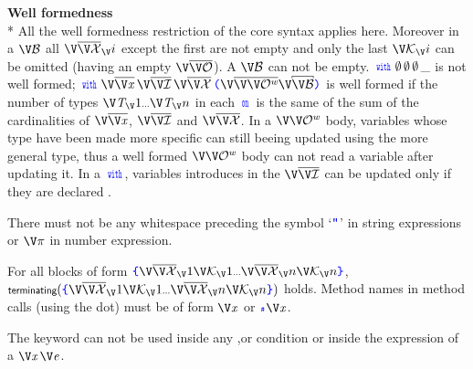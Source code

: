 \parbox{\linewidth}{
\textbf{Well formedness}\small\\*
All the well formedness restriction of the core syntax applies here.
Moreover in a $\block$ all $\es_\vi$ except the first are not empty and only the last $\catch_\vi$ can be omitted (having an empty $\ons$).
A $\block$ can not be empty.
$\withKw\, \emptyset\,\emptyset\, \emptyset\,\_$ is not well formed;
$\withKw\,\xs\,\is\,\es\, %
\oRound\Many\onWith\Opt\block\cRound$
is well formed if the number of types $\T_\vI\ldots\T_\vn$ in each $\onKw$ is the same of the sum of the cardinalities of $\xs$, $\is$ and $\es$.
In a $\onWith$ body, variables whose type have been made more specific can still beeing updated using the more general type, thus 
a well formed $\onWith$ body can not read a variable after updating it.
In a $\withKw$, variables introduces in the $\is$ can be updated only if they are declared \Q@var@.


There must not be any whitespace preceding the symbol `$ \mbox{\color{blue}{\texttt{"}}} $' in string expressions or $\Path$ in number expression.

For all blocks of form
$\oCurly\es_\vI\catch_\vI\ldots\es_\vn\catch_\vn\cCurly$,
$
\SyntaxFlow{\oCurly\es_\vI\catch_\vI\ldots\es_\vn\catch_\vn\cCurly}
$
holds.
Method names in method calls (using the dot) must be of form $\x$ or $\hash\x$.

The \Q@return@ keyword can not be used inside any \Q@if@,\Q@case@ or \Q@while@ condition or inside the expression of a $\x$\Q@in@$\e$.
}
